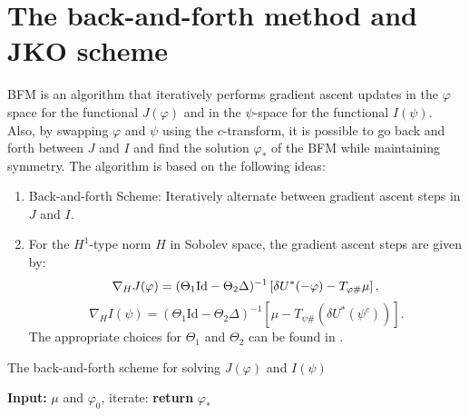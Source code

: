 \documentclass[a4,11pt, twocolumn, dvipdfmx]{article}
\theoremstyle{definition}
\begin{document}
\section{The back-and-forth method and JKO scheme }
BFM is an algorithm that iteratively performs gradient ascent updates in the \(\varphi\) space for the functional \(J(\varphi) \) and in the \(\psi\)-space for the functional \(I(\psi)\). 
Also, by swapping $\varphi$ and $\psi$ using the $c$-transform, it is possible to go back and forth between $J$ and $I$ and find the solution $\varphi_*$ of the BFM while maintaining symmetry.
The algorithm is based on the following ideas:
\begin{enumerate}
    \item Back-and-forth Scheme: Iteratively alternate between gradient ascent steps in $J$ and $I$.
    \item For the \(H^1\)-type norm \(H\) in Sobolev space, the gradient ascent steps are given by:
        \begin{equation*}
            \nabla_H J(\varphi) = (\Theta_1 \text{Id} - \Theta_2 \Delta)^{-1} \left[\delta U^*(- \varphi)-  T_{\varphi \#} \mu \right], \\
        \end{equation*}
        \begin{equation*}
            \nabla_H I(\psi) = (\Theta_1 \text{Id} - \Theta_2 \Delta)^{-1} \left[\mu - T_{\psi \#} (\delta U^*(\psi^c))\right].
        \end{equation*}
        The appropriate choices for \(\Theta_1\) and \(\Theta_2\) can be found in \cite{MR4238775}.
\end{enumerate}

\begin{algorithm}[tb]
    \caption{The back-and-forth scheme for solving $J(\varphi)$ and $I(\psi)$}
    \label{al:baf-method}
    \begin{algorithmic}
    \State \textbf{Input:} $\mu$ and $\varphi_0$, iterate:
    \State \textbf{return} $\varphi_*$
    \end{algorithmic}
\end{algorithm}
\end{document}
